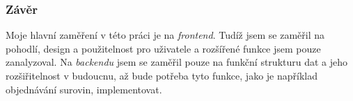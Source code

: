 \subsubsection{Závěr}
Moje hlavní zaměření v této práci je na \emph{frontend}. Tudíž jsem se zaměřil na pohodlí, design a použitelnost pro uživatele
a rozšířené funkce jsem pouze zanalyzoval. Na \emph{backendu} jsem se zaměřil pouze na funkční strukturu dat a jeho rozšiřitelnost
v budoucnu, až bude potřeba tyto funkce, jako je například objednávání surovin, implementovat.

